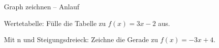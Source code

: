 \setcounter{aufgabe}{0}

\begin{aufgabe}{Graph zeichnen – Anlauf}
\begin{teile}
\teil Wertetabelle: Fülle die Tabelle zu $f(x) = 3x - 2$ aus.

\teil Mit n und Steigungsdreieck: Zeichne die Gerade zu $f(x) = -3x + 4$.

\begin{ksys}[xmin=-4,xmax=4,ymin=-4,ymax=5] \end{ksys}
\end{teile}
\end{aufgabe}

